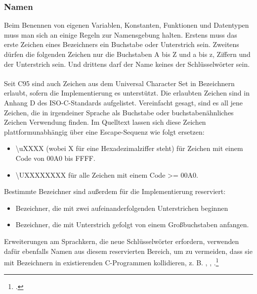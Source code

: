 \subsubsection{Namen}
Beim Benennen von eigenen Variablen, Konstanten, Funktionen und Datentypen muss man sich an einige Regeln zur Namensgebung halten. Erstens muss das erste Zeichen eines Bezeichners ein Buchstabe oder Unterstrich sein. Zweitens dürfen die folgenden Zeichen nur die Buchstaben A bis Z und a bis z, Ziffern und der Unterstrich sein. Und drittens darf der Name keines der Schlüsselwörter sein.\\
\\
Seit C95 sind auch Zeichen aus dem Universal Character Set in Bezeichnern erlaubt, sofern die Implementierung es unterstützt. Die erlaubten Zeichen sind in Anhang D des ISO-C-Standards aufgelistet. Vereinfacht gesagt, sind es all jene Zeichen, die in irgendeiner Sprache als Buchstabe oder buchstabenähnliches Zeichen Verwendung finden. Im Quelltext lassen sich diese Zeichen plattformunabhängig über eine Escape-Sequenz wie folgt ersetzen:
\begin{itemize}
\item \textbackslash uXXXX (wobei X für eine Hexadezimalziffer steht) für Zeichen mit einem Code von 00A0 bis FFFF.
\item \textbackslash UXXXXXXXX für alle Zeichen mit einem Code >= 00A0.
\end{itemize}
Bestimmte Bezeichner sind außerdem für die Implementierung reserviert:
\begin{itemize}
\item Bezeichner, die mit zwei aufeinanderfolgenden Unterstrichen beginnen
\item Bezeichner, die mit Unterstrich gefolgt von einem Großbuchstaben anfangen.
\end{itemize}
Erweiterungen am Sprachkern, die neue Schlüsselwörter erfordern, verwenden dafür ebenfalls Namen aus diesem reservierten Bereich, um zu vermeiden, dass sie mit Bezeichnern in existierenden C-Programmen kollidieren, z. B. , , .\footcite{c_wiki}
